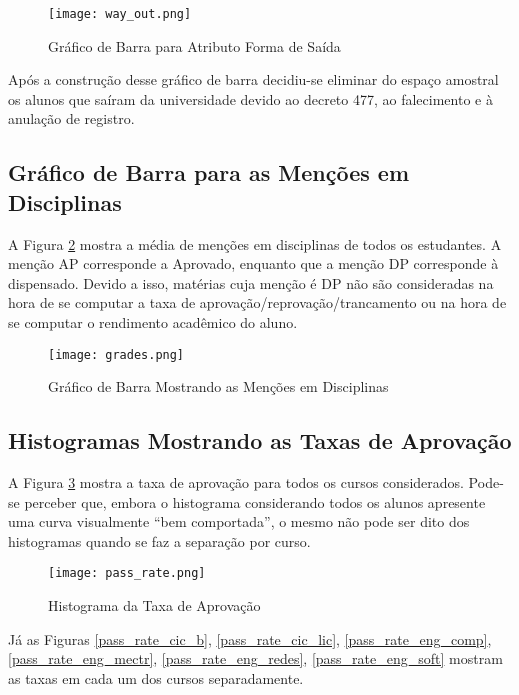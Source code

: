 \begin{figure}[!ht]
    \caption{Gráfico de Barra para Atributo Forma de Saída}
    \centering
    \texttt{[image: way\_out.png]}
    \label{atr_way_out}
\end{figure}

Após a construção desse gráfico de barra decidiu-se eliminar do espaço amostral os
alunos que saíram da universidade devido ao decreto 477, ao falecimento e à anulação
de registro. 

\subsection{Gráfico de Barra para as Menções em Disciplinas}
A Figura \ref{avg_grades} mostra a média de menções em disciplinas de todos os
estudantes. A menção AP corresponde a Aprovado, enquanto que a menção DP corresponde
à dispensado. Devido a isso, matérias cuja menção é DP não são consideradas na hora
de se computar a taxa de aprovação/reprovação/trancamento ou na hora de se computar o
rendimento acadêmico do aluno. 

\begin{figure}[!ht]
    \caption{Gráfico de Barra Mostrando as Menções em Disciplinas}
    \centering
    \texttt{[image: grades.png]}
    \label{avg_grades}
\end{figure}
\clearpage

\subsection{Histogramas Mostrando as Taxas de Aprovação}
A Figura \ref{pass_rate_all} mostra a taxa de aprovação para todos os cursos
considerados. 
Pode-se perceber que, embora o histograma considerando todos os alunos apresente uma
curva visualmente ``bem comportada'', o mesmo não pode ser dito dos histogramas
quando se faz a separação por curso.  

\begin{figure}[!ht]
    \caption{Histograma da Taxa de Aprovação}
    \centering
    \texttt{[image: pass\_rate.png]}
    \label{pass_rate_all}
\end{figure}

Já as Figuras \ref{pass_rate_cic_b}, \ref{pass_rate_cic_lic},
\ref{pass_rate_eng_comp}, \ref{pass_rate_eng_mectr}, \ref{pass_rate_eng_redes},
\ref{pass_rate_eng_soft} mostram as taxas em cada um dos cursos separadamente. 

